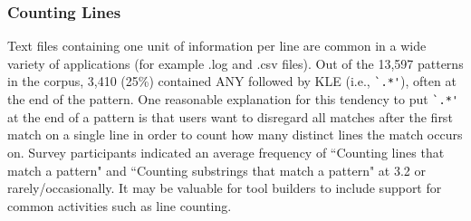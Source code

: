 
\subsubsection{Counting Lines}
Text files containing one unit of information per line are common in a wide variety of applications (for example .log and .csv files).  Out of the 13,597 patterns in the corpus, 3,410 (25\%) contained ANY followed by KLE  (i.e., \verb!`.*'!), often at the end of the pattern.
One reasonable explanation for this tendency to put \verb!`.*'! at the end of a pattern is that users want to disregard all matches after the first match on a single line in order to count how many distinct lines the match occurs on.  Survey participants indicated an average frequency of ``Counting lines that match a pattern" and ``Counting substrings that match a pattern" at 3.2 or rarely/occasionally. It may be valuable for tool builders to include support for common activities such as line counting.






